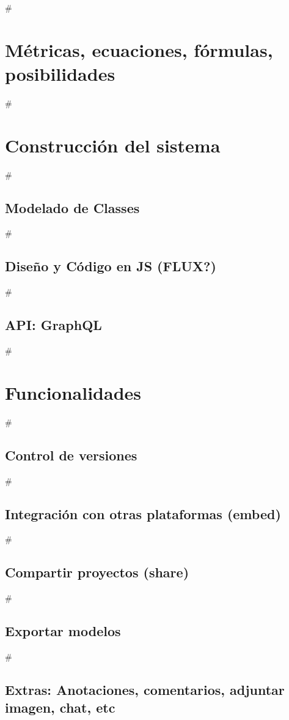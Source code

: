 #\section{Métricas, ecuaciones, fórmulas, posibilidades}


#\section{Construcción del sistema}

#\subsection{Modelado de Classes}

#\subsection{Diseño y Código en JS (FLUX?)}

#\subsection{API: GraphQL}


#\section{Funcionalidades}

#\subsection{Control de versiones}

#\subsection{Integración con otras plataformas (embed)}

#\subsection{Compartir proyectos (share)}

#\subsection{Exportar modelos}

#\subsection{Extras: Anotaciones, comentarios, adjuntar imagen, chat, etc}



